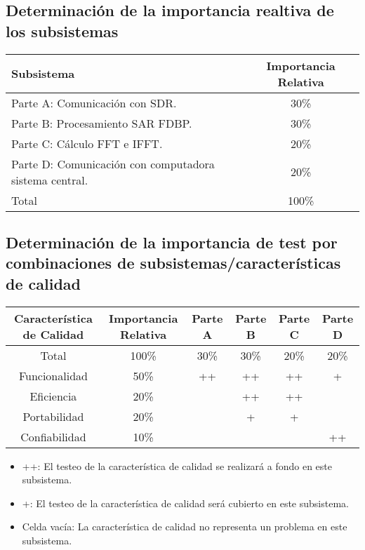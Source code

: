 \documentclass[
11pt, %
]{charter}
\begin{document}
\subsection{Determinación de la importancia realtiva de los subsistemas}

\begin{table}[h!]
\begin{center}
\begin{tabular}{| l | c |}
\hline
\rowcolor[HTML]{C0C0C0} 
Subsistema & Importancia Relativa\\\hline
Parte A: Comunicación con SDR. & 30\% \\ \hline
Parte B: Procesamiento SAR FDBP.    & 30\% \\ \hline
Parte C: Cálculo FFT e IFFT.  & 20\% \\ \hline
Parte D: Comunicación con computadora sistema central. & 20\% \\ \hline
\rowcolor[HTML]{C0C0C0} 
Total		  &100\% \\ \hline
\end{tabular}
\label{tab:Importancia Subsistemas}
\end{center}
\end{table} 





\subsection{Determinación de la importancia de test por combinaciones de subsistemas/características de calidad}

\begin{table}[h!]
\begin{center}
\begin{tabular}{| c | c | c | c | c | c |}
\hline
\rowcolor[HTML]{C0C0C0} 
Característica de Calidad & Importancia Relativa & Parte A & Parte B & Parte C & Parte D\\\hline
Total		  &100\% &    30\% &    30\% &    20\% &    20\%  \\ \hline
Funcionalidad & 50\% & ++ & ++ & ++ & +  \\ \hline
Eficiencia    & 20\% &   & ++  & ++ &   \\ \hline
Portabilidad  & 20\% &  & + & + &   \\ \hline
Confiabilidad & 10\% &  &  &  & ++  \\ \hline
\end{tabular}
\end{center}
\end{table} 

\begin{itemize}
\item[]++: El testeo de la característica de calidad se realizará a fondo en este subsistema.
\item[]+: El testeo de la característica de calidad será cubierto en este subsistema.
\item[]Celda vacía: La característica de calidad no representa un problema en este subsistema.
\end{itemize}
\end{document}
